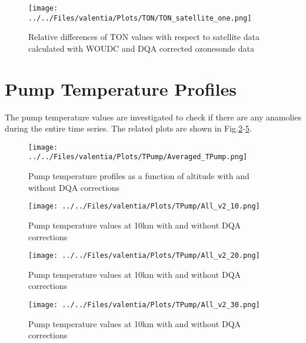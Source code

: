 \documentclass{article}
\begin{document}
                                     \begin{figure}
        \centering
\texttt{[image: ../../Files/valentia/Plots/TON/TON\_satellite\_one.png]}
    \caption{Relative differences of TON values with respect to satellite data calculated with WOUDC and DQA corrected ozonesonde data}
            \label{fig:ton3}
    \end{figure}

            \section{Pump Temperature Profiles}
    The pump temperature values are investigated to check if there are any anamolies during the entire time series.
    The related plots are shown in Fig.\ref{fig:av_tp}-\ref{fig:tp_30}.

                                         \begin{figure}
        \centering
\texttt{[image: ../../Files/valentia/Plots/TPump/Averaged\_TPump.png]}
    \caption{Pump temperature profiles as a function of altitude with and without DQA corrections}
            \label{fig:av_tp}
    \end{figure}

%
                                             \begin{figure}
        \centering
\texttt{[image: ../../Files/valentia/Plots/TPump/All\_v2\_10.png]}
    \caption{Pump temperature values at 10km with and without DQA corrections}
            \label{fig:tp_10}
    \end{figure}

                                                 \begin{figure}
        \centering
\texttt{[image: ../../Files/valentia/Plots/TPump/All\_v2\_20.png]}
    \caption{Pump temperature values at 10km with and without DQA corrections}
            \label{fig:tp_20}
    \end{figure}

                                                 \begin{figure}
        \centering
\texttt{[image: ../../Files/valentia/Plots/TPump/All\_v2\_30.png]}
    \caption{Pump temperature values at 10km with and without DQA corrections}
            \label{fig:tp_30}
    \end{figure}
\end{document}
